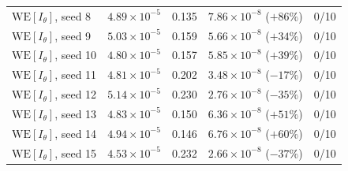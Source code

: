 \documentclass[a4paper,fleqn]{cas-sc}
\begin{document}
\begin{table}[H]
\begin{tabular}{lrrrr}
	$\mathrm{WE}[I_\theta]$, seed 8 & $4.89\times10^{-5}$ & 0.135 &
	$7.86\times10^{-8}$ ($+86\%$) & 0/10 \\
	$\mathrm{WE}[I_\theta]$, seed 9 & $5.03\times10^{-5}$ & 0.159 &
	$5.66\times10^{-8}$ ($+34\%$) & 0/10 \\
	$\mathrm{WE}[I_\theta]$, seed 10 & $4.80\times10^{-5}$ & 0.157 &
	$5.85\times10^{-8}$ ($+39\%$) & 0/10 \\
	$\mathrm{WE}[I_\theta]$, seed 11 & $4.81\times10^{-5}$ & 0.202 &
	$3.48\times10^{-8}$ ($-17\%$) & 0/10 \\
	$\mathrm{WE}[I_\theta]$, seed 12 & $5.14\times10^{-5}$ & 0.230 &
	$2.76\times10^{-8}$ ($-35\%$) & 0/10 \\
	$\mathrm{WE}[I_\theta]$, seed 13 & $4.83\times10^{-5}$ & 0.150 &
	$6.36\times10^{-8}$ ($+51\%$) & 0/10 \\
	$\mathrm{WE}[I_\theta]$, seed 14 & $4.94\times10^{-5}$ & 0.146 &
	$6.76\times10^{-8}$ ($+60\%$) & 0/10 \\
	$\mathrm{WE}[I_\theta]$, seed 15 & $4.53\times10^{-5}$ & 0.232 &
	$2.66\times10^{-8}$ ($-37\%$) & 0/10 \\
	\bottomrule
\end{tabular}
\end{table}
\end{document}
